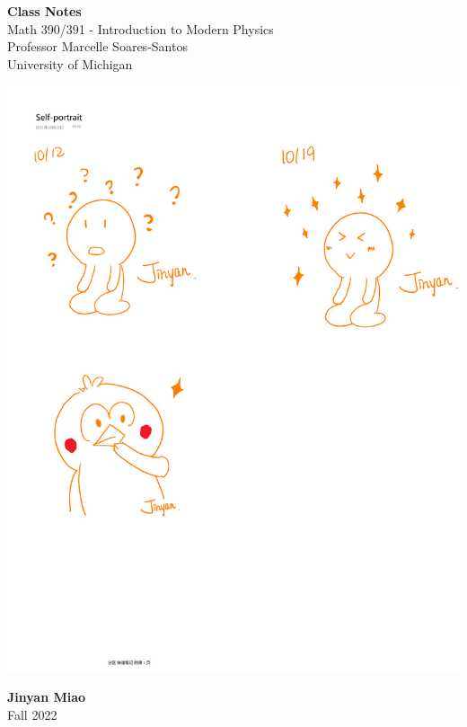 \documentclass[11pt]{article}
\theoremstyle{break}
\theoremstyle{break}
\begin{document}
	\begin{titlepage}
		\begin{center}
			\vspace*{1cm}
			\Huge \color{red}
				\textbf{Class Notes}\\
			\vspace{0.5cm}			
			\Large \color{black}
				Math 390/391 - Introduction to Modern Physics\\
				Professor Marcelle Soares-Santos\\	
				University of Michigan\\
			\vspace{2cm}

			\includegraphics[scale=1.15]{hmm.pdf}
			
			
			\vspace{4cm}
			\LARGE
				\textbf{Jinyan Miao}\\
				\hfill\break
				\LARGE Fall 2022\\
			\vspace{1cm}

		\vspace*{\fill}
		\end{center}			
	\end{titlepage}
\end{document}
